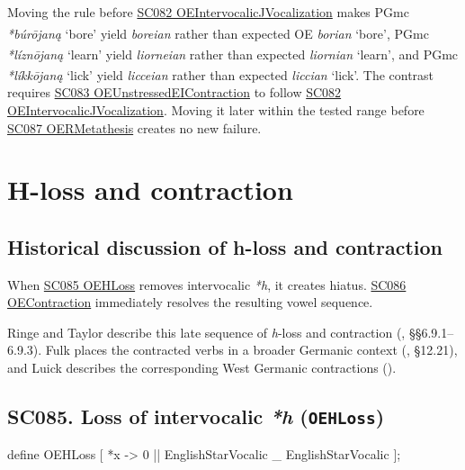 \documentclass[
  british,
  a4paper,
  openany]{book}
\providecommand{\Pred}[1]{\textsuperscript{\dag}\emph{#1}}
\providecommand{\Recon}[1]{\emph{*#1}}
{\catcode`→=\active \global\def→{\ensuremath{\rightarrow}}}
\providecommand{\texorpdfstring}[2]{#1}
\providecommand{\Pred}[1]{\textsuperscript{\dag}\emph{#1}}
\providecommand{\Recon}[1]{\emph{*#1}}
{\catcode`→=\active \global\def→{\ensuremath{\rightarrow}}}
\begin{document}
Moving the rule before \hyperref[rule-OEIntervocalicJVocalization]{SC082
OEIntervocalicJVocalization} makes PGmc \Recon{búrōjaną} `bore' yield
\Pred{boreian} rather than expected OE \emph{borian} `bore', PGmc
\Recon{líznōjaną} `learn' yield \Pred{liorneian} rather than expected
\emph{liornian} `learn', and PGmc \Recon{líkkōjaną} `lick' yield
\Pred{licceian} rather than expected \emph{liccian} `lick'. The contrast
requires \hyperref[rule-OEUnstressedEIContraction]{SC083
OEUnstressedEIContraction} to follow
\hyperref[rule-OEIntervocalicJVocalization]{SC082
OEIntervocalicJVocalization}. Moving it later within the tested range
before \hyperref[rule-OERMetathesis]{SC087 OERMetathesis} creates no new
failure.

\newpage

\section{H-loss and contraction}\label{h-loss-and-contraction}

\subsection{Historical discussion of h-loss and
contraction}\label{historical-discussion-of-h-loss-and-contraction}

When \hyperref[rule-OEHLoss]{SC085 OEHLoss} removes intervocalic
\emph{*h}, it creates hiatus. \hyperref[rule-OEContraction]{SC086
OEContraction} immediately resolves the resulting vowel sequence.

Ringe and Taylor describe this late sequence of \emph{h}-loss and
contraction (, §§6.9.1--6.9.3). Fulk places the contracted verbs in a broader
Germanic context (, §12.21), and
Luick describes the corresponding West Germanic contractions
().

\subsection{\texorpdfstring{SC085. Loss of intervocalic \emph{*h}
(\texttt{OEHLoss})}{SC085. Loss of intervocalic  (OEHLoss)}}\label{rule-OEHLoss}

\begin{ReaderFacingFoma}
define OEHLoss [
    {*x} -> 0 || EnglishStarVocalic _ EnglishStarVocalic
];
\end{ReaderFacingFoma}
\end{document}
